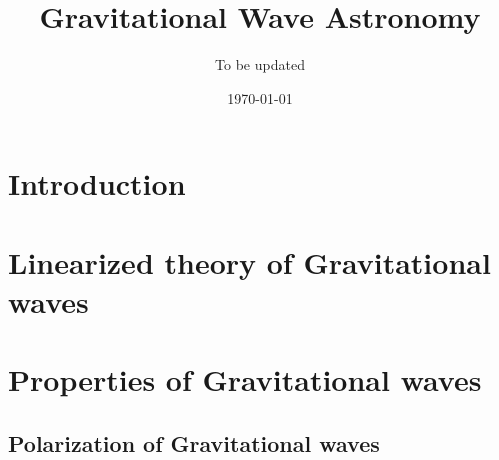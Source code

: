 \documentclass[16pt, a4paper]{report}
\title{Gravitational Wave Astronomy}
\author{To be updated}
\date{\today}
\begin{document}
\maketitle

\pagebreak

\pagebreak

\pagebreak
\section{Introduction}




\pagebreak

\pagebreak

\section{Linearized theory of Gravitational waves}


\pagebreak

\section{Properties of Gravitational waves}
\subsection{Polarization of Gravitational waves}




\end{document}
